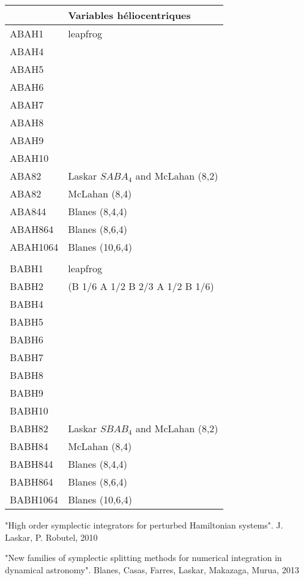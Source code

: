 \documentclass[11pt]{article}
\begin{document}
\begin{tabularx}{\textwidth}{|l|X|}
\hline
&Variables h\'eliocentriques\\
\hline
ABAH1 & leapfrog \\
ABAH4 & \\
ABAH5 & \\
ABAH6 & \\
ABAH7 & \\
ABAH8 & \\
ABAH9 & \\
ABAH10 & \\
ABA82 & Laskar $SABA_4$ and McLahan (8,2) \\
ABA82 & McLahan (8,4) \\
ABA844 & Blanes (8,4,4) \\
ABAH864  & Blanes (8,6,4) \\
ABAH1064 & Blanes (10,6,4) \\
&\\
BABH1& leapfrog\\
BABH2& (B 1/6 A 1/2 B 2/3 A 1/2 B 1/6)\\
BABH4& \\
BABH5& \\
BABH6& \\
BABH7& \\
BABH8& \\
BABH9& \\
BABH10& \\
BABH82 &  Laskar $SBAB_4$ and McLahan (8,2) \\
BABH84 &  McLahan (8,4) \\
BABH844 & Blanes (8,4,4) \\
BABH864  & Blanes (8,6,4) \\
BABH1064 & Blanes (10,6,4) \\
\hline
\end{tabularx}

"High order symplectic integrators for perturbed Hamiltonian systems".
J. Laskar, P. Robutel, 2010


"New families of symplectic splitting methods for numerical integration in dynamical astronomy". Blanes, Casas, Farres, Laskar, Makazaga, Murua, 2013 
\end{document}
